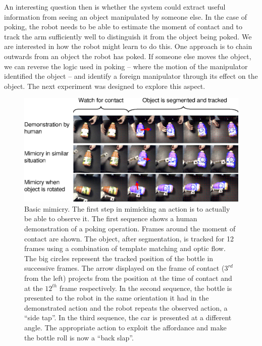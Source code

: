 

An interesting question then is
whether the system could extract useful information from seeing an
object manipulated by someone else.  In the case of poking, the robot
needs to be able to estimate the moment of contact and to track the arm
sufficiently well to distinguish it from the object being poked.  We
are interested in how the robot might learn to do this.  One approach
is to chain outwards from an object the robot has poked.  If someone
else moves the object, we can reverse the logic used in poking --
where the motion of the manipulator identified the object -- and
identify a foreign manipulator through its effect on the object.
The next experiment was designed to explore this aspect.


\begin{figure}[tb]
\begin{center}
\includegraphics[width=\textwidth]{fig-mimicry-bottle}
\caption{ 
\label{fig:observed-action}
%
Basic mimicry.  The first step in mimicking an action is to actually
be able to observe it.  The first sequence shows a human demonstration
of a poking operation.  Frames around the moment of contact are shown.
The object, after segmentation, is tracked for 12 frames using a
combination of template matching and optic flow.  The big circles
represent the tracked position of the bottle in successive frames.
The arrow displayed on the frame of contact ($3^{rd}$ from the left)
projects from the position at the time of contact and at the $12^{th}$
frame respectively.
%
In the second sequence, the bottle is presented to the robot in the
same orientation it had in the demonstrated action and the robot
repeats the observed action, a ``side tap''.  In the third sequence,
the car is presented at a different angle.  The appropriate action to
exploit the affordance and make the bottle roll is now a ``back
slap''.
%
%
}
\end{center}
\end{figure}

